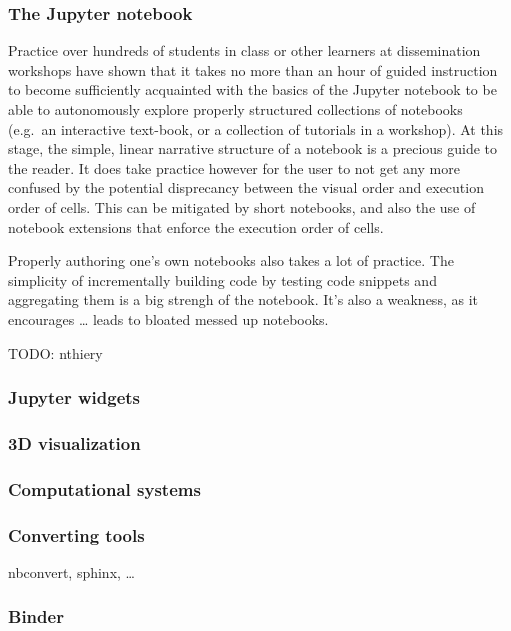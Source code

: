 \documentclass{deliverablereport}
\begin{document}
\subsubsection{The Jupyter notebook}

Practice over hundreds of students in class or other learners at
dissemination workshops have shown that it takes no more than an hour of
guided instruction to become sufficiently acquainted with the basics of
the Jupyter notebook to be able to autonomously explore properly
structured collections of notebooks (e.g.~an interactive text-book, or a
collection of tutorials in a workshop). At this stage, the simple,
linear narrative structure of a notebook is a precious guide to the
reader. It does take practice however for the user to not get any more
confused by the potential disprecancy between the visual order and
execution order of cells. This can be mitigated by short notebooks, and
also the use of notebook extensions that enforce the execution order of
cells.

Properly authoring one's own notebooks also takes a lot of practice. The
simplicity of incrementally building code by testing code snippets and
aggregating them is a big strengh of the notebook. It's also a weakness,
as it encourages \ldots{} leads to bloated messed up notebooks.

TODO: nthiery

\subsubsection{Jupyter widgets}

\subsubsection{3D visualization}

\subsubsection{Computational systems}

\subsubsection{Converting tools}

nbconvert, sphinx, \ldots{}

\subsubsection{Binder}
\end{document}
